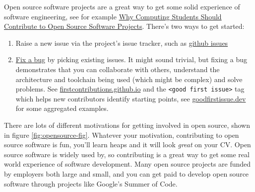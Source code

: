\documentclass[
]{book}
\providecommand{\tightlist}{%
  \setlength{\itemsep}{0pt}\setlength{\parskip}{0pt}}
\begin{document}
Open source software projects are a great way to get some solid experience of software engineering, see for example \href{https://cacm.acm.org/magazines/2021/7/253459-why-computing-students-should-contribute-to-open-source-software-projects/fulltext}{Why Computing Students Should Contribute to Open Source Software Projects}. \citep{sigman18} There's two ways to get started:

\begin{enumerate}
\def\labelenumi{\arabic{enumi}.}
\tightlist
\item
  Raise a new issue via the project's issue tracker, such as \href{https://guides.github.com/features/issues/}{github issues} \citep{githubissues}
\item
  \href{https://dev.to/rose/fixing-a-bug-on-my-open-source-project-from-start-to-finish-1749}{Fix a bug} by picking existing issues. \citep{fixabug} It might sound trivial, but fixing a bug demonstrates that you can collaborate with others, understand the architecture and toolchain being used (which might be complex) and solve problems. See \href{https://firstcontributions.github.io/}{firstcontributions.github.io} and the \texttt{\textless{}good\ first\ issue\textgreater{}} tag which helps new contributors identify starting points, see \href{https://goodfirstissue.dev/}{goodfirstissue.dev} for some aggregated examples.
\end{enumerate}

There are lots of different motivations for getting involved in open source, shown in figure \ref{fig:opensource-fig}. Whatever your motivation, contributing to open source software is fun, you'll learn heaps and it will look \emph{great} on your CV. Open source software is widely used by, so contributing is a great way to get some real world experience of software development. Many open source projects are funded by employers both large and small, and you can get paid to develop open source software through projects like Google's Summer of Code. \citep{gsoc}
\end{document}
